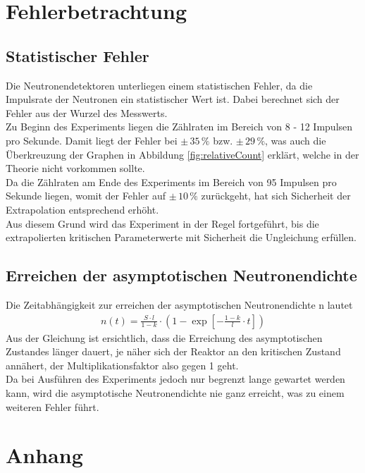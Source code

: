 \documentclass[12pt,german]{article}
\begin{document}
    \section{Fehlerbetrachtung}

    \subsection{Statistischer Fehler}
    Die Neutronendetektoren unterliegen einem statistischen Fehler, da die Impulsrate der Neutronen ein statistischer Wert ist.
    Dabei berechnet sich der Fehler aus der Wurzel des Messwerts. \\
    Zu Beginn des Experiments liegen die Zählraten im Bereich von 8 - 12 Impulsen pro Sekunde. Damit liegt der Fehler bei $\pm\, 35\, \%$ bzw. $\pm\, 29\, \%$, was auch die Überkreuzung der Graphen in Abbildung \ref{fig:relativeCount} erklärt, welche in der Theorie nicht vorkommen sollte. \\
    Da die Zählraten am Ende des Experiments im Bereich von 95 Impulsen pro Sekunde liegen, womit der Fehler auf $\pm\, 10\, \%$ zurückgeht, hat sich Sicherheit der Extrapolation entsprechend erhöht. \\
    Aus diesem Grund wird das Experiment in der Regel fortgeführt, bis die extrapolierten kritischen Parameterwerte mit Sicherheit die Ungleichung erfüllen.
    
    \subsection{Erreichen der asymptotischen Neutronendichte}
    Die Zeitabhängigkeit zur erreichen der asymptotischen Neutronendichte n lautet
    \begin{align*}
        n(t) = \frac{S \cdot l}{1 - k} \cdot \left(1 - \exp \left[- \frac{1 - k}{l} \cdot t\right] \right)
    \end{align*}
    Aus der Gleichung ist ersichtlich, dass die Erreichung des asymptotischen Zustandes länger dauert, je näher sich der Reaktor an den kritischen Zustand annähert, der Multiplikationsfaktor also gegen 1 geht. \\
    Da bei Ausführen des Experiments jedoch nur begrenzt lange gewartet werden kann, wird die asymptotische Neutronendichte nie ganz erreicht, was zu einem weiteren Fehler führt.

    \newpage
    \section{Anhang}
\end{document}
